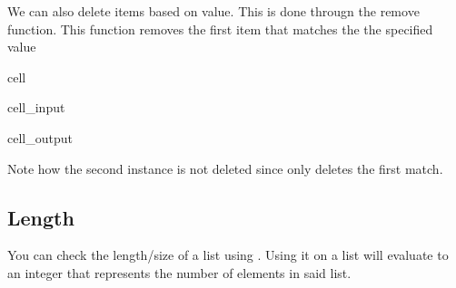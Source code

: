 \documentclass[letterpaper,10pt,english]{jupyterBook}
\begin{document}
\sphinxAtStartPar
We can also delete items based on value. This is done througn the remove function. This function removes the first item that matches the the specified value

\begin{sphinxuseclass}{cell}\begin{sphinxVerbatimInput}

\begin{sphinxuseclass}{cell_input}
\begin{sphinxVerbatim}[commandchars=\\\{\}]
  \PYG{p}{[}   \PYG{p}{]}
\end{sphinxVerbatim}

\end{sphinxuseclass}\end{sphinxVerbatimInput}
\begin{sphinxVerbatimOutput}

\begin{sphinxuseclass}{cell_output}
\begin{sphinxVerbatim}
\end{sphinxVerbatim}

\end{sphinxuseclass}\end{sphinxVerbatimOutput}

\end{sphinxuseclass}
\sphinxAtStartPar
Note how the second instance  is not deleted since  only deletes the first match.


\subsection{Length}
\label{\detokenize{datatypes:length}}
\sphinxAtStartPar
You can check the length/size of a list using . Using it on a list will evaluate to an integer that represents the number of elements in said list.
\end{document}
